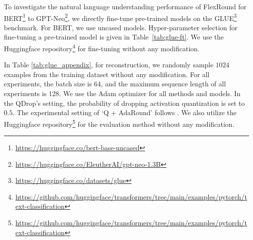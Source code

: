 \documentclass{article}
\theoremstyle{plain}
\theoremstyle{definition}
\theoremstyle{remark}
\begin{document}
% 

To investigate the natural language understanding performance of FlexRound for BERT\footnote{\url{https://huggingface.co/bert-base-uncased}} to GPT-Neo\footnote{\url{https://huggingface.co/EleutherAI/gpt-neo-1.3B}}, we directly fine-tune pre-trained models on the GLUE\footnote{\url{https://huggingface.co/datasets/glue}} benchmark. For BERT, we use uncased models. Hyper-parameter selection for fine-tuning a pre-trained model is given in Table~\ref{tab:glue-ft}.  We use the Huggingface repository\footnote{\url{https://github.com/huggingface/transformers/tree/main/examples/pytorch/text-classification}} for fine-tuning without any modification.

In Table \ref{tab:glue_appendix}, for reconstruction, we randomly sample $1024$ examples from the training dataset without any modification. For all experiments, the batch size is 64, and the maximum sequence length of all experiments is 128. We use the Adam optimizer for all methods and models. In the QDrop's setting, the probability of dropping activation quantization is set to $0.5$. The experimental setting of `Q + AdaRound' follows \citet{wei2022qdrop}. We also utilize the Huggingface repository\footnote{\url{https://github.com/huggingface/transformers/tree/main/examples/pytorch/text-classification}} for the evaluation method without any modification.
\end{document}
